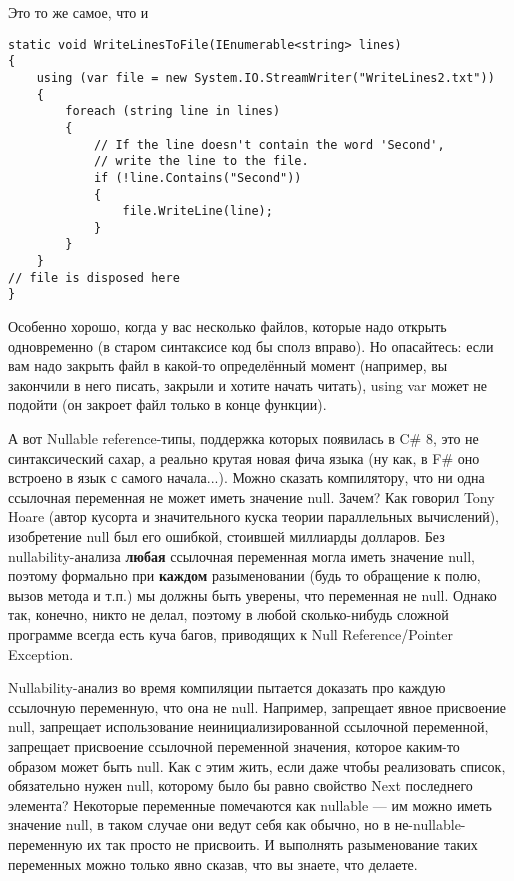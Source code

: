 \documentclass[a5paper]{article}
\begin{document}
Это то же самое, что и

\begin{verbatim}
static void WriteLinesToFile(IEnumerable<string> lines)
{
    using (var file = new System.IO.StreamWriter("WriteLines2.txt")) 
    {
        foreach (string line in lines)
        {
            // If the line doesn't contain the word 'Second', 
            // write the line to the file.
            if (!line.Contains("Second"))
            {
                file.WriteLine(line);
            }
        }
    }
// file is disposed here
}
\end{verbatim}

Особенно хорошо, когда у вас несколько файлов, которые надо открыть одновременно (в старом синтаксисе код бы сполз вправо). Но опасайтесь: если вам надо закрыть файл в какой-то определённый момент (например, вы закончили в него писать, закрыли и хотите начать читать), using var может не подойти (он закроет файл только в конце функции).

А вот Nullable reference-типы, поддержка которых появилась в C\# 8, это не синтаксический сахар, а реально крутая новая фича языка (ну как, в F\# оно встроено в язык с самого начала...). Можно сказать компилятору, что ни одна ссылочная переменная не может иметь значение null. Зачем? Как говорил Tony Hoare (автор кусорта и значительного куска теории параллельных вычислений), изобретение null был его ошибкой, стоившей миллиарды долларов. Без nullability-анализа \textbf{любая} ссылочная переменная могла иметь значение null, поэтому формально при \textbf{каждом} разыменовании (будь то обращение к полю, вызов метода и т.п.) мы должны быть уверены, что переменная не null. Однако так, конечно, никто не делал, поэтому в любой сколько-нибудь сложной программе всегда есть куча багов, приводящих к Null Reference/Pointer Exception.

Nullability-анализ во время компиляции пытается доказать про каждую ссылочную переменную, что она не null. Например, запрещает явное присвоение null, запрещает использование неинициализированной ссылочной переменной, запрещает присвоение ссылочной переменной значения, которое каким-то образом может быть null. Как с этим жить, если даже чтобы реализовать список, обязательно нужен null, которому было бы равно свойство Next последнего элемента? Некоторые переменные помечаются как nullable --- им можно иметь значение null, в таком случае они ведут себя как обычно, но в не-nullable-переменную их так просто не присвоить. И выполнять разыменование таких переменных можно только явно сказав, что вы знаете, что делаете. 
\end{document}
